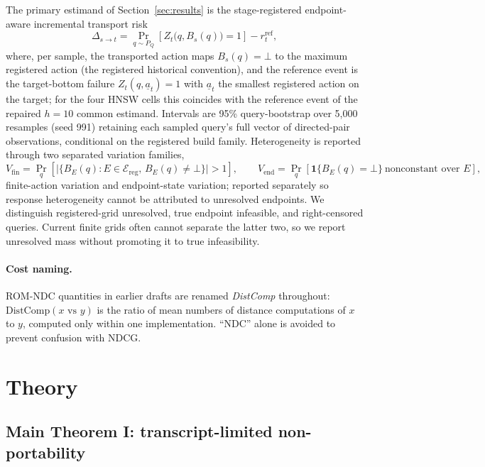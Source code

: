 \documentclass{article}
\newcommand{\DistComp}{\mathrm{DistComp}}
\renewcommand{\Pr}{\mathop{\mathrm{Pr}}}   %
\newcommand{\Ecal}{\mathcal{E}}
\newcommand{\BOT}{\bot}
\begin{document}
The primary estimand of Section~\ref{sec:results} is the stage-registered endpoint-aware incremental
transport risk
\begin{equation}
\Delta_{s\rightarrow t}
=\Pr_{q\sim P_{Q}}\!\left[Z_{t}\big(q,B_{s}(q)\big){=}1\right]-r_{t}^{\mathrm{ref}},
\label{eq:delta}
\end{equation}
where, per sample, the transported action maps $B_s(q){=}\BOT$ to the maximum registered action (the
registered historical convention), and the reference event is the target-bottom failure
$Z_t(q,\underline{a}_t){=}1$ with $\underline{a}_t$ the smallest registered action on the target; for the
four HNSW cells this coincides with the reference event of the repaired $h{=}10$ common estimand. Intervals are 95\%
query-bootstrap over 5{,}000 resamples (seed 991) retaining each sampled query's full vector of directed-pair
observations, conditional on the registered build family. Heterogeneity is reported through two separated
variation families,
\begin{equation}
V_{\mathrm{fin}}=\Pr_{q}\!\left[\big|\{B_{E}(q):E\in\Ecal_{\mathrm{reg}},\,B_{E}(q)\neq\BOT\}\big|>1\right],
\qquad
V_{\mathrm{end}}=\Pr_{q}\!\left[\mathbf{1}\{B_{E}(q){=}\BOT\}\ \text{nonconstant over }E\right],
\label{eq:var}
\end{equation}
finite-action variation and endpoint-state variation; reported separately so response heterogeneity cannot
be attributed to unresolved endpoints. We distinguish registered-grid unresolved, true endpoint infeasible,
and right-censored queries. Current finite grids often cannot separate the latter two, so we report
unresolved mass without promoting it to true infeasibility.

\paragraph{Cost naming.}
ROM-NDC quantities in earlier drafts are renamed \emph{DistComp} throughout:
$\DistComp(x \text{ vs } y)$ is the ratio of mean numbers of distance computations of $x$ to $y$, computed
only within one implementation. ``NDC'' alone is avoided to prevent confusion with NDCG.

\section{Theory}
\label{sec:theory}

\subsection{Main Theorem I: transcript-limited non-portability}
\end{document}

